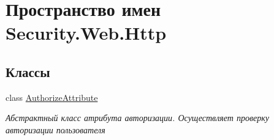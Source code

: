 \hypertarget{namespace_security_1_1_web_1_1_http}{}\section{Пространство имен Security.\+Web.\+Http}
\label{namespace_security_1_1_web_1_1_http}
\subsection*{Классы}
\begin{DoxyCompactItemize}
\item 
class \hyperlink{class_security_1_1_web_1_1_http_1_1_authorize_attribute}{Authorize\+Attribute}
\begin{DoxyCompactList}\small\item\em Абстрактный класс атрибута авторизации. Осуществляет проверку авторизации пользователя \end{DoxyCompactList}\end{DoxyCompactItemize}
